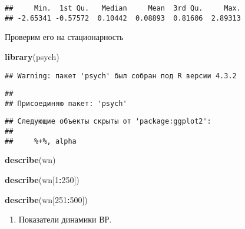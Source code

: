 \documentclass[
]{article}
\newenvironment{Shaded}{\begin{snugshade}}{\end{snugshade}}
\newcommand{\DecValTok}[1]{\textcolor[rgb]{0.00,0.00,0.81}{#1}}
\newcommand{\FunctionTok}[1]{\textcolor[rgb]{0.13,0.29,0.53}{\textbf{#1}}}
\newcommand{\NormalTok}[1]{#1}
\newcommand{\SpecialCharTok}[1]{\textcolor[rgb]{0.81,0.36,0.00}{\textbf{#1}}}
\providecommand{\tightlist}{%
  \setlength{\itemsep}{0pt}\setlength{\parskip}{0pt}}
\begin{document}
\begin{verbatim}
##     Min.  1st Qu.   Median     Mean  3rd Qu.     Max. 
## -2.65341 -0.57572  0.10442  0.08893  0.81606  2.89313
\end{verbatim}

Проверим его на стационарность

\begin{Shaded}
\begin{Highlighting}[]
\FunctionTok{library}\NormalTok{(psych)}
\end{Highlighting}
\end{Shaded}

\begin{verbatim}
## Warning: пакет 'psych' был собран под R версии 4.3.2
\end{verbatim}

\begin{verbatim}
## 
## Присоединяю пакет: 'psych'
\end{verbatim}

\begin{verbatim}
## Следующие объекты скрыты от 'package:ggplot2':
## 
##     %+%, alpha
\end{verbatim}

\begin{Shaded}
\begin{Highlighting}[]
\FunctionTok{describe}\NormalTok{(wn)}
\end{Highlighting}
\end{Shaded}

\begin{Shaded}
\begin{Highlighting}[]
\FunctionTok{describe}\NormalTok{(wn[}\DecValTok{1}\SpecialCharTok{:}\DecValTok{250}\NormalTok{])}
\end{Highlighting}
\end{Shaded}

\begin{Shaded}
\begin{Highlighting}[]
\FunctionTok{describe}\NormalTok{(wn[}\DecValTok{251}\SpecialCharTok{:}\DecValTok{500}\NormalTok{])}
\end{Highlighting}
\end{Shaded}

\begin{enumerate}
\def\labelenumi{\arabic{enumi}.}
\setcounter{enumi}{3}
\tightlist
\item
  Показатели динамики ВР.
\end{enumerate}
\end{document}

